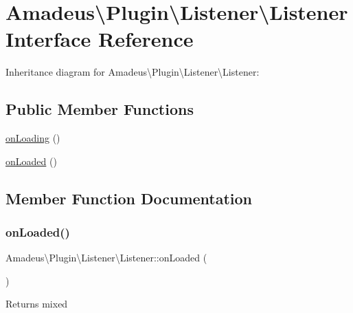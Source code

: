 \hypertarget{interfaceAmadeus_1_1Plugin_1_1Listener_1_1Listener}{}\section{Amadeus\textbackslash{}Plugin\textbackslash{}Listener\textbackslash{}Listener Interface Reference}
\label{interfaceAmadeus_1_1Plugin_1_1Listener_1_1Listener}


Inheritance diagram for Amadeus\textbackslash{}Plugin\textbackslash{}Listener\textbackslash{}Listener\+:
\subsection*{Public Member Functions}
\begin{DoxyCompactItemize}
\item 
\hyperlink{interfaceAmadeus_1_1Plugin_1_1Listener_1_1Listener_ad97885a35170528fea1748f62fc364ff}{on\+Loading} ()
\item 
\hyperlink{interfaceAmadeus_1_1Plugin_1_1Listener_1_1Listener_a0911f5c1f902c2cbc005c4eb6ab99206}{on\+Loaded} ()
\end{DoxyCompactItemize}


\subsection{Member Function Documentation}
\mbox{\label{interfaceAmadeus_1_1Plugin_1_1Listener_1_1Listener_a0911f5c1f902c2cbc005c4eb6ab99206}} 
\subsubsection{\texorpdfstring{on\+Loaded()}{onLoaded()}}
{\footnotesize\ttfamily Amadeus\textbackslash{}\+Plugin\textbackslash{}\+Listener\textbackslash{}\+Listener\+::on\+Loaded (\begin{DoxyParamCaption}{ }\end{DoxyParamCaption})}

\begin{DoxyReturn}{Returns}
mixed 
\end{DoxyReturn}
\mbox{\label{interfaceAmadeus_1_1Plugin_1_1Listener_1_1Listener_ad97885a35170528fea1748f62fc364ff}} 
